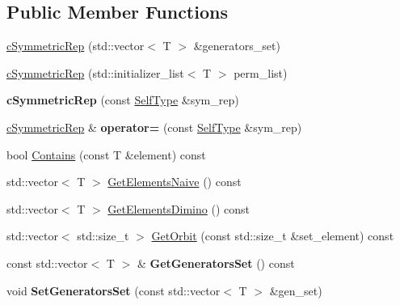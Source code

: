 \subsection*{\-Public \-Member \-Functions}
\begin{DoxyCompactItemize}
\item 
\hyperlink{classcSymmetricRep_a64f4c25b8f5aebbd78f49f3485aed88f}{c\-Symmetric\-Rep} (std\-::vector$<$ \-T $>$ \&generators\-\_\-set)
\item 
\hyperlink{classcSymmetricRep_a47ba133fe6f1ba2b8d3da5ae6cb001d9}{c\-Symmetric\-Rep} (std\-::initializer\-\_\-list$<$ \-T $>$ perm\-\_\-list)
\item 
\hypertarget{classcSymmetricRep_a5fa8e9aabcacfddbf5f8d896a9bf6c94}{{\bfseries c\-Symmetric\-Rep} (const \hyperlink{classcSymmetricRep}{\-Self\-Type} \&sym\-\_\-rep)}\label{classcSymmetricRep_a5fa8e9aabcacfddbf5f8d896a9bf6c94}

\item 
\hypertarget{classcSymmetricRep_a42ce2132ef0a6c51f7afc4496c121cbe}{\hyperlink{classcSymmetricRep}{c\-Symmetric\-Rep} \& {\bfseries operator=} (const \hyperlink{classcSymmetricRep}{\-Self\-Type} \&sym\-\_\-rep)}\label{classcSymmetricRep_a42ce2132ef0a6c51f7afc4496c121cbe}

\item 
bool \hyperlink{classcSymmetricRep_a60f095284b40e494a34fda76e1fc7ecd}{\-Contains} (const \-T \&element) const 
\item 
std\-::vector$<$ \-T $>$ \hyperlink{classcSymmetricRep_a935cec1dbd90a09581f1aa7f150eb9de}{\-Get\-Elements\-Naive} () const 
\item 
std\-::vector$<$ \-T $>$ \hyperlink{classcSymmetricRep_ad9f112b996c14824bd1d669aed162cbf}{\-Get\-Elements\-Dimino} () const 
\item 
std\-::vector$<$ std\-::size\-\_\-t $>$ \hyperlink{classcSymmetricRep_a62cbd7057456f503eec43d592497e94f}{\-Get\-Orbit} (const std\-::size\-\_\-t \&set\-\_\-element) const 
\item 
\hypertarget{classcSymmetricRep_af90591a8af82e61668da036efa04a5fd}{const std\-::vector$<$ \-T $>$ \& {\bfseries \-Get\-Generators\-Set} () const }\label{classcSymmetricRep_af90591a8af82e61668da036efa04a5fd}

\item 
\hypertarget{classcSymmetricRep_a10df8259eeafac4f03c8d7b251f37dfb}{void {\bfseries \-Set\-Generators\-Set} (const std\-::vector$<$ \-T $>$ \&gen\-\_\-set)}\label{classcSymmetricRep_a10df8259eeafac4f03c8d7b251f37dfb}


\end{DoxyCompactItemize}
